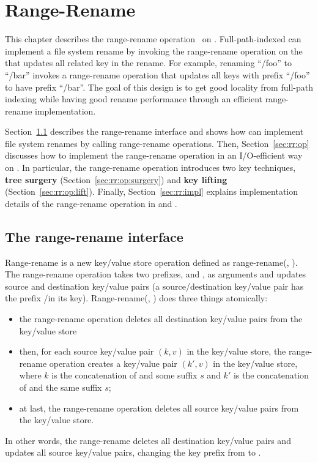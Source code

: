 \chapter{Range-Rename}
\label{chap:rename}

This chapter describes the range-rename operation~\citep{betrfs4,betrfs4tos}
on \bets.
Full-path-indexed \betrfs can implement a file system rename by invoking the
range-rename operation on the \bet that updates all related key in the rename.
For example, renaming ``/foo'' to ``/bar'' invokes a range-rename operation
that updates all keys with prefix ``/foo'' to have prefix ``/bar''.
The goal of this design is to get good locality from full-path indexing
while having good rename performance through an efficient range-rename
implementation.

Section~\ref{sec:rr:int} describes the range-rename interface and shows how
\betrfs can implement file system renames by calling range-rename operations.
Then, Section~\ref{sec:rr:op} discusses how to implement the range-rename operation
in an I/O-efficient way on \bets.
In particular, the range-rename operation introduces two key techniques,
\textbf{tree surgery} (Section~\ref{sec:rr:op:surgery}) and
\textbf{key lifting} (Section~\ref{sec:rr:op:lift}).
Finally, Section~\ref{sec:rr:impl} explains implementation details of
the range-rename operation in \fti and \betrfs.

\section{The range-rename interface}
\label{sec:rr:int}

Range-rename is a new key/value store operation defined as
range-rename(\spre, \dpre).
The range-rename operation takes two prefixes, \spre and \dpre, as arguments
and updates source and destination key/value pairs
(a source/destination key/value pair has the prefix \spre/\dpre in its key).
Range-rename(\spre, \dpre) does three things atomically:
\begin{itemize}
\item the range-rename operation deletes all destination key/value pairs
    from the key/value store
\item then, for each source key/value pair $(k,v)$ in the key/value store,
    the range-rename operation creates a key/value pair $(k',v)$
    in the key/value store, where $k$ is the concatenation of \spre and some
    suffix $s$ and $k'$ is the concatenation of \dpre and the same suffix $s$;
\item at last, the range-rename operation deletes all source key/value pairs
    from the key/value store.
\end{itemize}
In other words, the range-rename deletes all destination key/value pairs and
updates all source key/value pairs, changing the key prefix from \spre to \dpre.

